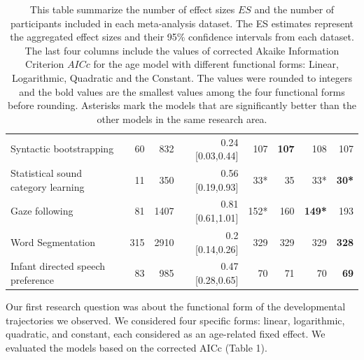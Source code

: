 \documentclass[10pt, letterpaper]{article}
\begin{document}
\begin{table}[ht]
\begin{tabular}{l|r|r|r|r|r|r|r}
Syntactic bootstrapping & 60 & 832 & 0.24 [0.03,0.44] & 107 & \textbf{107} & 108 & 107\\
Statistical sound category learning & 11 & 350 & 0.56 [0.19,0.93]& 33* & 35 & 33* & \textbf{30*}\\
Gaze following & 81 & 1407 & 0.81 [0.61,1.01] & 152* & 160 & \textbf{149*} & 193\\
Word Segmentation & 315 & 2910 & 0.2 [0.14,0.26] & 329 & 329 & 329 & \textbf{328}\\
Infant directed speech preference & 83 & 985 & 0.47 [0.28,0.65] & 70 & 71 & 70 & \textbf{69}\\
\hline
\end{tabular}
\caption{\label{demo-table}This table summarize the number of effect sizes \(ES\) and the number of participants included in each meta-analysis dataset. The ES estimates represent the aggregated effect sizes and their 95\% confidence intervals from each dataset. The last four columns include the values of corrected Akaike Information Criterion \(AICc\) for the age model with different functional forms: Linear, Logarithmic, Quadratic and the Constant. The values were rounded to integers and the bold values are the smallest values among the four functional forms before rounding. Asterisks mark the models that are significantly better than the other models in the same research area.}
\end{table}

Our first research question was about the functional form of the
developmental trajectories we observed. We considered four specific
forms: linear, logarithmic, quadratic, and constant, each considered as
an age-related fixed effect. We evaluated the models based on the
corrected AICc (Table 1).
\end{document}
